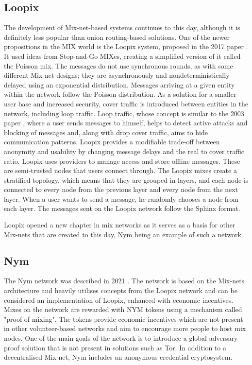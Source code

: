 \subsection{Loopix}
The development of Mix-net-based systems continues to this day, although it is definitely less popular than onion routing-based solutions. One of the newer propositions in the MIX world is the Loopix system, proposed in the 2017 paper \cite{loopix}. It used ideas from Stop-and-Go MIXes, creating a simplified version of it called the Poisson mix. The messages do not use synchronous rounds, as with some different Mix-net designs; they are asynchronously and nondeterministically delayed using an exponential distribution. Messages arriving at a given entity within the network follow the Poisson distribution. As a solution for a smaller user base and increased security, cover traffic is introduced between entities in the network, including loop traffic. Loop traffic, whose concept is similar to the 2003 paper \cite{n-1}, where a user sends messages to himself, helps to detect active attacks and blocking of messages and, along with drop cover traffic, aims to hide communication patterns. Loopix provides a modifiable trade-off between anonymity and usability by changing message delays and the real to cover traffic ratio. Loopix uses providers to manage access and store offline messages. These are semi-trusted nodes that users connect through. The Loopix mixes create a stratified topology, which means that they are grouped in layers, and each node is connected to every node from the previous layer and every node from the next layer. When a user wants to send a message, he randomly chooses a node from each layer. The messages sent on the Loopix network follow the Sphinx format.

Loopix opened a new chapter in mix networks as it serves as a basis for other Mix-nets that are created to this day, Nym \cite{nym} being an example of such a network.

\subsection{Nym}
The Nym network was described in 2021 \cite{nym}. The network is based on the Mix-nets architecture and heavily utilises concepts from the Loopix network and can be considered an implementation of Loopix, enhanced with economic incentives. Mixes on the network are rewarded with NYM tokens using a mechanism called "proof of mixing". The tokens provide economic incentives which are not present in other volunteer-based networks and aim to encourage more people to host mix nodes. One of the main goals of the network is to introduce a global adversary-proof solution that is not present in solutions such as Tor. In addition to a decentralised Mix-net, Nym includes an anonymous credential cryptosystem.

